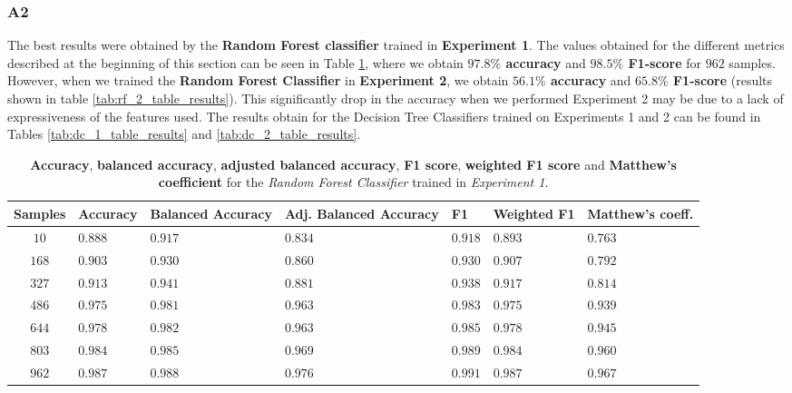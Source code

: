 \documentclass[sigplan,screen]{acmart}
\begin{document}
\subsubsection{A2}

The best results were obtained by the \textbf{Random Forest classifier} trained in \textbf{Experiment 1}. The values obtained for the different metrics described at the beginning of this section can be seen in Table \ref{tab:rf_1_table_results}, where we obtain \textbf{$97.8\%$ accuracy} and \textbf{$98.5\%$ F1-score} for $962$ samples. However, when we trained the \textbf{Random Forest Classifier} in \textbf{Experiment 2}, we obtain \textbf{$56.1\%$ accuracy} and \textbf{$65.8\%$ F1-score} (results shown in table \ref{tab:rf_2_table_results}). This significantly drop in the accuracy when we performed Experiment 2 may be due to a lack of expressiveness of the features used. The results obtain for the Decision Tree Classifiers trained on Experiments 1 and 2 can be found in Tables \ref{tab:dc_1_table_results} and \ref{tab:dc_2_table_results}.

\begin{table}[h]
  \caption{\textbf{Accuracy}, \textbf{balanced accuracy}, \textbf{adjusted balanced accuracy}, \textbf{F1 score}, \textbf{weighted F1 score} and \textbf{Matthew's coefficient} for the \emph{Random Forest Classifier} trained in \emph{Experiment 1}.}
  \label{tab:rf_1_table_results}
  \begin{tabular}{cllllll}
    \toprule
    \textbf{Samples}&\textbf{Accuracy}&\textbf{Balanced Accuracy}&\textbf{Adj. Balanced Accuracy}&\textbf{F1}&\textbf{Weighted F1}&\textbf{Matthew's coeff.}\\
    \midrule
    $10$ & $0.888$ & $0.917$ & $0.834$ & $0.918$ & $0.893$ & $0.763$\\
    $168$ & $0.903$ & $0.930$ & $0.860$ & $0.930$ & $0.907$ & $0.792$\\
    $327$ & $0.913$ & $0.941$ & $0.881$ & $0.938$ & $0.917$ & $0.814$\\
    $486$ & $0.975$ & $0.981$ & $0.963$ & $0.983$ & $0.975$ & $0.939$\\
    $644$ & $0.978$ & $0.982$ & $0.963$ & $0.985$ & $0.978$ & $0.945$\\
    $803$ & $0.984$ & $0.985$ & $0.969$ & $0.989$ & $0.984$ & $0.960$\\
    $962$ & $0.987$ & $0.988$ & $0.976$ & $0.991$ & $0.987$ & $0.967$\\
    \bottomrule
    \end{tabular}
\end{table}
\end{document}
